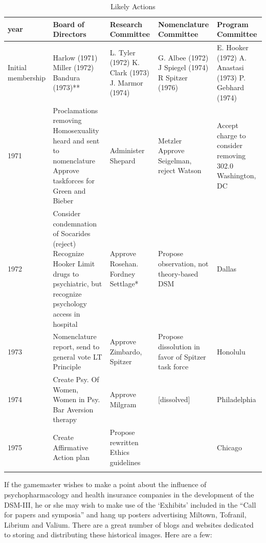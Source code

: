  \begin{longtable}[!t]{ | p{1cm} | p{2cm} | p{1cm} |  p{10cm} | p{2cm} | }
\hline
year&
Board of Directors&
Research Committee&
Nomenclature Committee&
Program Committee\\ \hline
Initial membership&
Harlow (1971)\newline
Miller (1972)\newline
Bandura (1973)\newline
[A: Milgram]*\newline
[B: Albee]*&
L. Tyler (1972)\newline
K. Clark (1973)\newline
J. Marmor (1974)&
G. Albee (1972)\newline
J Spiegel (1974)\newline
R Spitzer (1976)&
E. Hooker (1972)\newline
A. Anastasi (1973)\newline
P. Gebhard (1974)\\

1971&
Proclamations removing Homosexuality heard and sent to nomenclature\newline
Approve taskforces for Green and Bieber &
Administer Shepard & Metzler\newline
Approve Seigelman, reject Watson&
Accept charge to consider removing 302.0
Washington, DC\\
1972&
Consider condemnation of Socarides (reject)\newline
Recognize Hooker\newline
Limit drugs to psychiatric, but recognize psychology access in hospital&
Approve Rosehan. Fordney Settlage*&
Propose observation, not theory-based DSM&
Dallas\\
1973&
Nomenclature report, send to general vote\newline
LT Principle&
Approve Zimbardo, Spitzer&
Propose dissolution in favor of Spitzer task force&
Honolulu\\
1974&
Create Psy. Of Women, Women in Psy.\newline
Bar Aversion therapy&
Approve Milgram&
[dissolved]&
Philadelphia\\
1975&
Create Affirmative Action plan&
Propose rewritten Ethics guidelines&
 &
Chicago\\
\hline

\caption{Likely Actions}
\label{table: likelyactions}
\end{longtable}

If the gamemaster wishes to make a point about the influence of psychopharmacology and health insurance companies in the development of the DSM-III, he or she may wish to make use of the `Exhibits' included in the “Call for papers and symposia” and hang up posters advertising Miltown, Tofranil, Librium and Valium. There are a great number of blogs and websites dedicated to storing and distributing these historical images. Here are a few:

